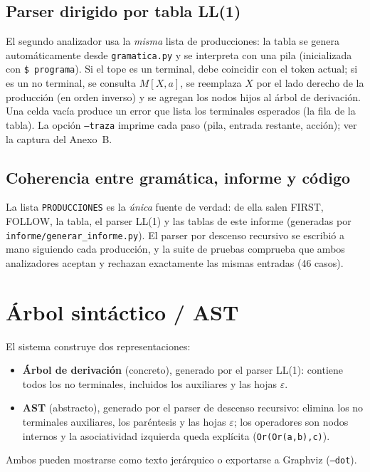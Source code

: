 \subsection{Parser dirigido por tabla LL(1)}
El segundo analizador usa la \emph{misma} lista de producciones: la tabla se genera automáticamente desde \texttt{gramatica.py} y se
interpreta con una pila (inicializada con \texttt{\$ programa}). Si el tope es un terminal, debe coincidir con el token actual; si es un
no terminal, se consulta $M[X,a]$, se reemplaza $X$ por el lado derecho de la producción (en orden inverso) y se agregan los
nodos hijos al árbol de derivación. Una celda vacía produce un error que lista los terminales esperados (la fila de la tabla).
La opción \texttt{--traza} imprime cada paso (pila, entrada restante, acción); ver la captura del Anexo~B.



\subsection{Coherencia entre gramática, informe y código}
La lista \texttt{PRODUCCIONES} es la \emph{única} fuente de verdad: de ella salen FIRST, FOLLOW, la tabla, el parser LL(1) y las tablas de este
informe (generadas por \texttt{informe/generar\_informe.py}). El parser por descenso recursivo se escribió a mano siguiendo cada
producción, y la suite de pruebas comprueba que ambos analizadores aceptan y rechazan exactamente las mismas entradas
(46 casos).

\section{Árbol sintáctico / AST}

El sistema construye dos representaciones:
\begin{itemize}[nosep]
\item \textbf{Árbol de derivación} (concreto), generado por el parser LL(1): contiene todos los no terminales, incluidos los auxiliares y las hojas $\varepsilon$.
\item \textbf{AST} (abstracto), generado por el parser de descenso recursivo: elimina los no terminales auxiliares, los paréntesis y las hojas $\varepsilon$; los
operadores son nodos internos y la asociatividad izquierda queda explícita (\texttt{Or(Or(a,b),c)}).
\end{itemize}
Ambos pueden mostrarse como texto jerárquico o exportarse a Graphviz (\texttt{--dot}).

